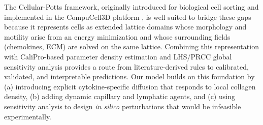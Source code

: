 The Cellular-Potts framework, originally introduced for biological cell sorting \cite{graner1992simulation} and implemented in the CompuCell3D platform \cite{swat2012compucell3d}, is well suited to bridge these gaps because it represents cells as extended lattice domains whose morphology and motility arise from an energy minimization and whose surrounding fields (chemokines, ECM) are solved on the same lattice. Combining this representation with CaliPro-based parameter density estimation \cite{joslyn2021calipro} and LHS/PRCC global sensitivity analysis \cite{marino2008sensitivity} provides a route from literature-derived rules to calibrated, validated, and interpretable predictions. Our model builds on this foundation by (a) introducing explicit cytokine-specific diffusion that responds to local collagen density, (b) adding dynamic capillary and lymphatic agents, and (c) using sensitivity analysis to design \emph{in silico} perturbations that would be infeasible experimentally.
